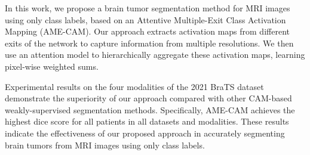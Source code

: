 

In this work, we propose a brain tumor segmentation method for MRI images using only class labels, based on an Attentive Multiple-Exit Class Activation Mapping (AME-CAM). Our approach extracts activation maps from different exits of the network to capture information from multiple resolutions. We then use an attention model to hierarchically aggregate these activation maps, learning pixel-wise weighted sums.

Experimental results on the four modalities of the 2021 BraTS dataset demonstrate the superiority of our approach compared with other CAM-based weakly-supervised segmentation methods. Specifically, AME-CAM achieves the highest dice score for all patients in all datasets and modalities. These results indicate the effectiveness of our proposed approach in accurately segmenting brain tumors from MRI images using only class labels.